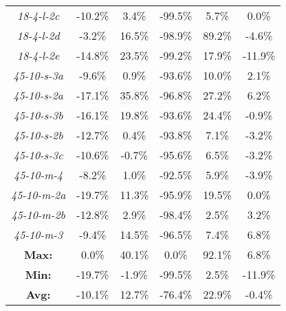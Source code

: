\begin{table}[htbp!]
\begin{tabular}{cccccc}
\emph{18-4-l-2c}    &   -10.2\%  &   3.4\%    &   -99.5\%  &   5.7\%    &   0.0\%    \\
\emph{18-4-l-2d}    &   -3.2\%   &   16.5\%   &   -98.9\%  &   89.2\%   &   -4.6\%   \\
\emph{18-4-l-2e}    &   -14.8\%  &   23.5\%   &   -99.2\%  &   17.9\%   &   -11.9\%  \\
\emph{45-10-s-3a}   &   -9.6\%   &   0.9\%    &   -93.6\%  &   10.0\%   &   2.1\%    \\
\emph{45-10-s-2a}   &   -17.1\%  &   35.8\%   &   -96.8\%  &   27.2\%   &   6.2\%    \\
\emph{45-10-s-3b}   &   -16.1\%  &   19.8\%   &   -93.6\%  &   24.4\%   &   -0.9\%   \\
\emph{45-10-s-2b}   &   -12.7\%  &   0.4\%    &   -93.8\%  &   7.1\%    &   -3.2\%   \\
\emph{45-10-s-3c}   &   -10.6\%  &   -0.7\%   &   -95.6\%  &   6.5\%    &   -3.2\%   \\
\emph{45-10-m-4}    &   -8.2\%   &   1.0\%    &   -92.5\%  &   5.9\%    &   -3.9\%   \\
\emph{45-10-m-2a}   &   -19.7\%  &   11.3\%   &   -95.9\%  &   19.5\%   &   0.0\%    \\
\emph{45-10-m-2b}   &   -12.8\%  &   2.9\%    &   -98.4\%  &   2.5\%    &   3.2\%    \\
\emph{45-10-m-3}    &   -9.4\%   &   14.5\%   &   -96.5\%  &   7.4\%    &   6.8\%    \\ 
\midrule
\textbf{Max:}   &   0.0\%    &   40.1\%   &   0.0\%    &   92.1\%   &   6.8\%    \\
\textbf{Min:}   &   -19.7\%  &   -1.9\%   &   -99.5\%  &   2.5\%    &   -11.9\%  \\
\textbf{Avg:}   &   -10.1\%  &   12.7\%   &   -76.4\%  &   22.9\%   &   -0.4\%   \\
    \bottomrule
    \end{tabular}
    \label{table:comparisonofqualities}
\end{table}